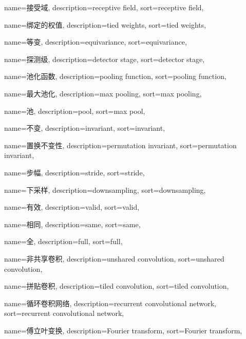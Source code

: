 {
  name=接受域,
  description={receptive field},
  sort={receptive field},
}

{
  name=绑定的权值,
  description={tied weights},
  sort={tied weights},
}

{
  name=等变,
  description={equivariance},
  sort={equivariance},
}

{
  name=探测级,
  description={detector stage},
  sort={detector stage},
}

{
  name=池化函数,
  description={pooling function},
  sort={pooling function},
}

{
  name=最大池化,
  description={max pooling},
  sort={max pooling},
}

{
  name=池,
  description={pool},
  sort={max pool},
}

{
  name=不变,
  description={invariant},
  sort={invariant},
}

{
  name=置换不变性,
  description={permutation invariant},
  sort={permutation invariant},
}

{
  name=步幅,
  description={stride},
  sort={stride},
}

{
  name=下采样,
  description={downsampling},
  sort={downsampling},
}

{
  name=有效,
  description={valid},
  sort={valid},
}

{
  name=相同,
  description={same},
  sort={same},
}

{
  name=全,
  description={full},
  sort={full},
}

{
  name=非共享卷积,
  description={unshared convolution},
  sort={unshared convolution},
}

{
  name=拼贴卷积,
  description={tiled convolution},
  sort={tiled convolution},
}

{
  name=循环卷积网络,
  description={recurrent convolutional network},
  sort={recurrent convolutional network},
}

{
  name=傅立叶变换,
  description={Fourier transform},
  sort={Fourier transform},
}


